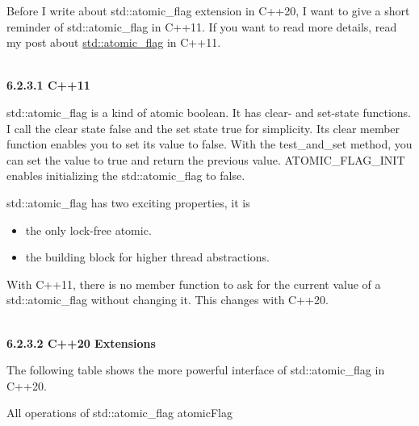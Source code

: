 Before I write about std::atomic\_flag extension in C++20, I want to give a short reminder of std::atomic\_flag in C++11. If you want to read more details, read my post about \href{https://www.modernescpp.com/index.php/the-atomic-flag}{std::atomic\_flag} in C++11.

\hspace*{\fill} \\ %
\noindent
\textbf{6.2.3.1\hspace{0.2cm}  C++11}

std::atomic\_flag is a kind of atomic boolean. It has clear- and set-state functions. I call the clear state false and the set state true for simplicity. Its clear member function enables you to set its value to false. With the test\_and\_set method, you can set the value to true and return the previous value. ATOMIC\_FLAG\_INIT enables initializing the std::atomic\_flag to false.

std::atomic\_flag has two exciting properties, it is

\begin{itemize}
\item 
the only lock-free atomic.

\item 
the building block for higher thread abstractions.
\end{itemize}

With C++11, there is no member function to ask for the current value of a std::atomic\_flag without changing it. This changes with C++20.

\hspace*{\fill} \\ %
\noindent
\textbf{6.2.3.2\hspace{0.2cm} C++20 Extensions}

The following table shows the more powerful interface of std::atomic\_flag in C++20.

\begin{center}
All operations of std::atomic\_flag atomicFlag
\end{center}


